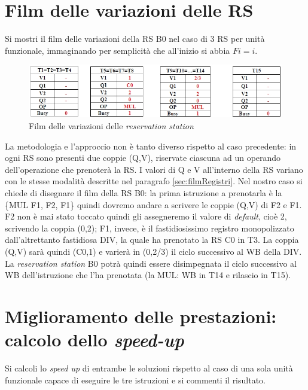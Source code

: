 \section{Film delle variazioni delle RS}
\label{sec:filmRS}

\textsf{Si mostri il film delle variazioni della RS B0 nel caso di 3 RS per unità funzionale, immaginando per
semplicità che all'inizio si abbia $Fi=i$.}\\

\begin{figure}[!h]
\centering
\includegraphics[width=\columnwidth]{img/tomasEs1d}
\caption{Film delle variazioni delle \textit{reservation station}}
\label{fig:tomasEs1d}
\end{figure}

La metodologia e l'approccio non è tanto diverso rispetto al caso precedente: in ogni RS sono presenti due coppie (Q,V), riservate ciascuna ad un operando dell'operazione che prenoterà la RS. I valori di Q e V all'interno della RS variano con le stesse modalità descritte nel paragrafo \ref{sec:filmRegistri}.
Nel nostro caso si chiede di disegnare il film della RS B0: la prima istruzione a prenotarla è la \{MUL F1, F2, F1\} quindi dovremo andare a scrivere le coppie (Q,V) di F2 e F1. F2 non è mai stato toccato quindi gli assegneremo il valore di \textit{default}, cioè 2, scrivendo la coppia (0,2); F1, invece, è il fastidiosissimo registro monopolizzato dall'altrettanto fastidiosa DIV, la quale ha prenotato la RS C0 in T3. La coppia (Q,V) sarà quindi (C0,1) e varierà in (0,2/3) il ciclo successivo al WB della DIV. La \textit{reservation station} B0 potrà quindi essere disimpegnata il ciclo successivo al WB dell'istruzione che l'ha prenotata (la MUL: WB in T14 e rilascio in T15).

\section{Miglioramento delle prestazioni: calcolo dello \textit{speed-up}}
\label{sec:viagra}

\textsf{Si calcoli lo \textit{speed up }di entrambe le soluzioni rispetto al caso di una sola unità funzionale capace di
eseguire le tre istruzioni e si commenti il risultato}.\\

